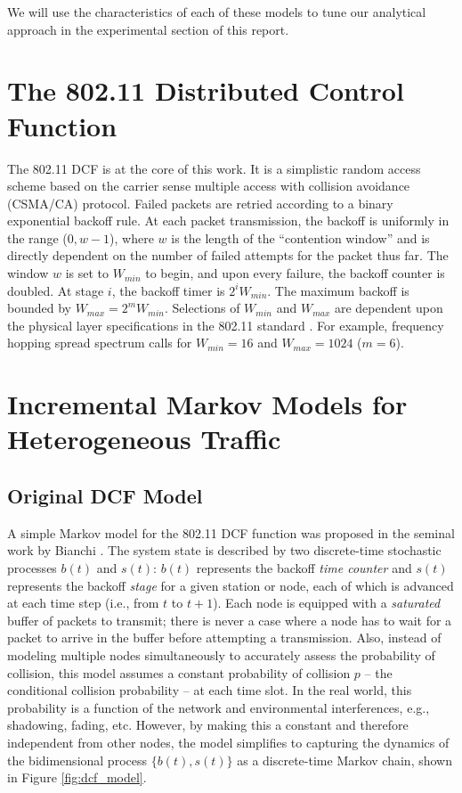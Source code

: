 \documentclass[conference]{IEEEtran}
\begin{document}
We will use the characteristics of each of these models to tune our analytical approach in the experimental section of this report. 

\section{The 802.11 Distributed Control Function}
The 802.11 DCF \cite{ieee1997wireless} is at the core of this work. It is a simplistic random access scheme based on the carrier sense multiple access with collision avoidance (CSMA/CA) protocol. Failed packets are retried according to a binary exponential backoff rule. At each packet transmission, the backoff is uniformly in the range ($0, w-1$), where $w$ is the length of the ``contention window'' and is directly dependent on the number of failed attempts for the packet thus far. The window $w$ is set to $W_{min}$ to begin, and upon every failure, the backoff counter is doubled. At stage $i$, the backoff timer is $2^iW_{min}$. The maximum backoff is bounded by $W_{max} = 2^mW_{min}$. Selections of $W_{min}$ and $W_{max}$ are dependent upon the physical layer specifications in the 802.11 standard \cite{ieee1997wireless,dcf}. For example, frequency hopping spread spectrum calls for $W_{min} = 16$ and $W_{max} = 1024$ ($m = 6$). 

\section{Incremental Markov Models for Heterogeneous Traffic}

\subsection{Original DCF Model}
A simple Markov model for the 802.11 DCF function was proposed in the seminal work by Bianchi \cite{dcf}. The system state is described by two discrete-time stochastic processes $b(t)$ and $s(t)$: $b(t)$ represents the backoff \emph{time counter} and $s(t)$ represents the backoff \emph{stage} for a given station or node, each of which is advanced at each time step (i.e., from $t$ to $t + 1$). Each node is equipped with a \emph{saturated} buffer of packets to transmit; there is never a case where a node has to wait for a packet to arrive in the buffer before attempting a transmission. Also, instead of modeling multiple nodes simultaneously to accurately assess the probability of collision, this model assumes a constant probability of collision $p$ -- the conditional collision probability -- at each time slot. In the real world, this probability is a function of the network and environmental interferences, e.g., shadowing, fading, etc. However, by making this a constant and therefore independent from other nodes, the model simplifies to capturing the dynamics of the bidimensional process $\{ b(t), s(t) \}$ as a discrete-time Markov chain, shown in Figure \ref{fig:dcf_model}. 
\end{document}
